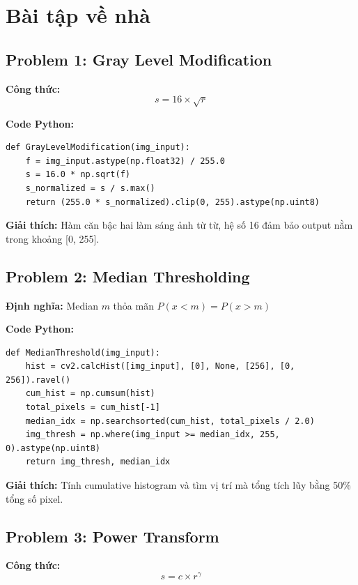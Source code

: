 \documentclass[12pt,a4paper]{article}
\begin{document}
\section{Bài tập về nhà}

\subsection{Problem 1: Gray Level Modification}

\textbf{Công thức:}
\[ s = 16 \times \sqrt{r} \]

\textbf{Code Python:}
\begin{lstlisting}
def GrayLevelModification(img_input):
    f = img_input.astype(np.float32) / 255.0
    s = 16.0 * np.sqrt(f)
    s_normalized = s / s.max()
    return (255.0 * s_normalized).clip(0, 255).astype(np.uint8)
\end{lstlisting}

\textbf{Giải thích:} Hàm căn bậc hai làm sáng ảnh từ từ, hệ số 16 đảm bảo output nằm trong khoảng [0, 255].

\subsection{Problem 2: Median Thresholding}

\textbf{Định nghĩa:} Median $m$ thỏa mãn $P(x < m) = P(x > m)$

\textbf{Code Python:}
\begin{lstlisting}
def MedianThreshold(img_input):
    hist = cv2.calcHist([img_input], [0], None, [256], [0, 256]).ravel()
    cum_hist = np.cumsum(hist)
    total_pixels = cum_hist[-1]
    median_idx = np.searchsorted(cum_hist, total_pixels / 2.0)
    img_thresh = np.where(img_input >= median_idx, 255, 0).astype(np.uint8)
    return img_thresh, median_idx
\end{lstlisting}

\textbf{Giải thích:} Tính cumulative histogram và tìm vị trí mà tổng tích lũy bằng 50\% tổng số pixel.

\subsection{Problem 3: Power Transform}

\textbf{Công thức:}
\[ s = c \times r^{\gamma} \]
\end{document}
